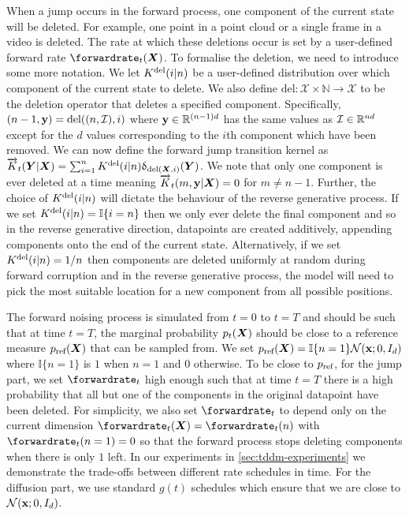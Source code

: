 When a jump occurs in the forward process, one component of the current state will be deleted.
For example, one point in a point cloud or a single frame in a video is deleted. The rate at which these deletions occur is set by a user-defined forward rate $\smash{\forwardrate_t}(\mX)$. To formalise the deletion, we need to introduce some more notation. We let $K^{\textup{del}}(i | n)$ be a user-defined distribution over which component of the current state to delete. We also define $\text{del}: \mathcal{X} \times \mathbb{N} \rightarrow \mathcal{X}$ to be the deletion operator that deletes a specified component. Specifically, $(n-1, {\mathbf{y}}) = \text{del}((n, \mathcal{I}), i)$ where ${\mathbf{y}} \in \mathbb{R}^{(n-1)d}$ has the same values as $\mathcal{I} \in \mathbb{R}^{nd}$ except for the $d$ values corresponding to the $i$th component which have been removed. 
We can now define the forward jump transition kernel as $\overrightarrow{K}_t({\bm{Y}} | {\bm{X}}) = \sum_{i=1}^n K^{\textup{del}} (i | n) \updelta_{\text{del}({\bm{X}}, i)}({\bm{Y}})$. We note that only one
component is ever deleted at a time meaning $\overrightarrow{K}_t(m, {\mathbf{y}} | {\bm{X}}) = 0$ for $m \neq n - 1$. Further, the choice of $K^{\textup{del}}(i | n)$ will dictate the behaviour of the reverse generative process. If we set $K^{\textup{del}}(i | n) = \mathbb{I}\{i=n\}$ then we only ever delete the final component and so in the reverse generative direction, datapoints are created additively, appending components onto the end of the current state. Alternatively, if we set $K^{\textup{del}}(i | n) = 1/n$ then components are deleted uniformly at random during forward corruption and in the reverse generative process, the model will need to pick the most suitable location for a new component from all possible positions.

The forward noising process is simulated from $t=0$ to $t=T$ and should be such that at time $t=T$, the marginal probability $p_t({\bm{X}})$ should be close to a reference measure $p_{\textup{ref}}({\bm{X}})$ that can be sampled from. 
We set $p_{\textup{ref}}({\bm{X}}) = \mathbb{I} \{ n = 1\} \mathcal{N}({\mathbf{x}}; 0, I_{d})$ where $\mathbb{I} \{ n = 1\}$ is $1$ when $n=1$ and $0$ otherwise. To be close to $p_{\textup{ref}}$, for the jump part, we set $\forwardrate_t$ high enough such that at time $t=T$ there is a high probability that all but one of the components in the original datapoint have been deleted. For simplicity, we also set $\forwardrate_t$ to depend only on the current dimension $\forwardrate_t(\mX) = \forwardrate_t(n)$ with $\forwardrate_t(n=1) = 0$ so that the forward process stops deleting components when there is only $1$ left. In our experiments in \cref{sec:tddm-experiments} we demonstrate the trade-offs between different rate schedules in time. For the diffusion part, we use standard $g(t)$ schedules which ensure that we are close to $\mathcal{N}({\mathbf{x}}; 0, I_{d})$.

